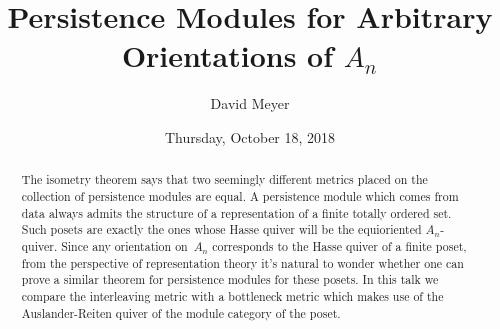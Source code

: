 \documentclass{UAmathtalk}
\author{David Meyer}
\title{Persistence Modules for Arbitrary Orientations of \(A_n\)}
\date{Thursday, October 18, 2018}
\begin{document}
\maketitle

\begin{abstract}
The isometry theorem says that two seemingly different metrics placed on the collection of persistence modules are equal. A persistence module which comes from data always admits the structure of a representation of a finite totally ordered set. Such posets are exactly the ones whose Hasse quiver will be the equioriented $A_n$-quiver. Since any orientation on~$A_n$ corresponds to the Hasse quiver of a finite poset, from the perspective of representation theory it's natural to wonder whether one can prove a similar theorem for persistence modules for these posets. In this talk we compare the interleaving metric with a bottleneck metric which makes use of the Auslander-Reiten quiver of the module category of the poset.
\end{abstract}
\end{document}
